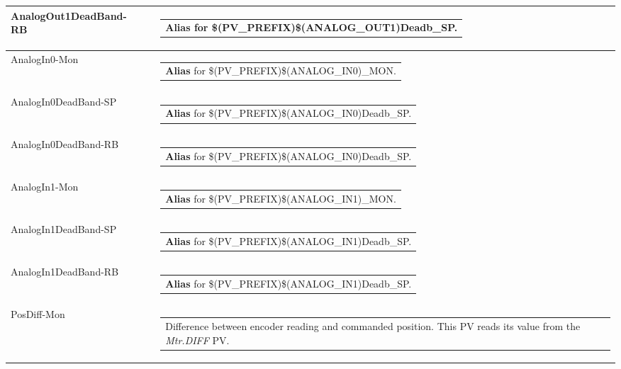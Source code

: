 \documentclass[openany]{article}
\begin{document}
\begin{longtable}{| m{4.5cm} m{2.5cm}  m{8.5cm} |}
        AnalogOut1DeadBand-RB &  & \begin{tabular}{@{}m{6cm}@{}}
                \textbf{\color{blue} Alias} for \$(PV\_PREFIX)\$(ANALOG\_OUT1)Deadb\_SP.
            \end{tabular} \hypertarget{pv:analog-in-0-mon}{}\\ \hline
        AnalogIn0-Mon &  & \begin{tabular}{@{}m{6cm}@{}}
                \textbf{\color{blue} Alias} for \$(PV\_PREFIX)\$(ANALOG\_IN0)\_MON.
            \end{tabular} \hypertarget{pv:analog-in-0-dead-band}{}\\ \hline
        AnalogIn0DeadBand-SP &  & \begin{tabular}{@{}m{6cm}@{}}
                \textbf{\color{blue} Alias} for \$(PV\_PREFIX)\$(ANALOG\_IN0)Deadb\_SP.
            \end{tabular} \hypertarget{}{}\\ \hline
        AnalogIn0DeadBand-RB &  & \begin{tabular}{@{}m{6cm}@{}}
                \textbf{\color{blue} Alias} for \$(PV\_PREFIX)\$(ANALOG\_IN0)Deadb\_SP.
            \end{tabular} \hypertarget{pv:analog-in-1-mon}{}\\ \hline
        AnalogIn1-Mon &  & \begin{tabular}{@{}m{6cm}@{}}
                \textbf{\color{blue} Alias} for \$(PV\_PREFIX)\$(ANALOG\_IN1)\_MON.
            \end{tabular} \hypertarget{pv:analog-in-1-dead-band}{}\\ \hline
        AnalogIn1DeadBand-SP &  & \begin{tabular}{@{}m{6cm}@{}}
                \textbf{\color{blue} Alias} for \$(PV\_PREFIX)\$(ANALOG\_IN1)Deadb\_SP.
            \end{tabular} \hypertarget{}{}\\ \hline
        AnalogIn1DeadBand-RB &  & \begin{tabular}{@{}m{6cm}@{}}
                \textbf{\color{blue} Alias} for \$(PV\_PREFIX)\$(ANALOG\_IN1)Deadb\_SP.
            \end{tabular} \hypertarget{pv:pos-diff-mon}{}\\ \hline
        PosDiff-Mon &  & \begin{tabular}{@{}m{6cm}@{}}
                Difference between encoder reading and commanded position. This PV reads its value from the \emph{Mtr.DIFF} PV.

\end{tabular}
\end{longtable}
\end{document}
